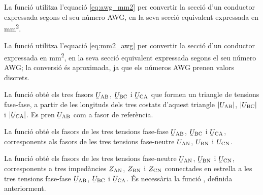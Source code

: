 


La funció  utilitza l'equació \eqref{eq:awg_mm2} per convertir la secció d'un conductor expressada segons el seu número AWG, en la seva secció equivalent expressada en \unit{mm^2}.




La funció  utilitza l'equació \eqref{eq:mm2_awg} per convertir la secció d'un conductor expressada en \unit{mm^2}, en la seva secció equivalent expressada segons el seu número AWG; la conversió és aproximada, ja que els números AWG prenen valors discrets.




La funció  obté els tres fasors $\cmplx{U}\ped{AB}$, $\cmplx{U}\ped{BC}$ i $\cmplx{U}\ped{CA}$ que formen un triangle de tensions fase-fase, a partir de les longituds dels tres costats d'aquest triangle $|\cmplx{U}\ped{AB}|$, $|\cmplx{U}\ped{BC}|$ i $|\cmplx{U}\ped{CA}|$. Es pren $\cmplx{U}\ped{AB}$ com a fasor de referència.




La funció  obté els fasors de les tres tensions fase-fase $\cmplx{U}\ped{AB}$, $\cmplx{U}\ped{BC}$ i $\cmplx{U}\ped{CA}$, corresponents als fasors de les tres tensions fase-neutre
$\cmplx{U}\ped{AN}$, $\cmplx{U}\ped{BN}$ i $\cmplx{U}\ped{CN}$.




La funció  obté els fasors de les tres tensions fase-neutre $\cmplx{U}\ped{AN}$, $\cmplx{U}\ped{BN}$ i $\cmplx{U}\ped{CN}$, corresponents a tres impedàncies $\cmplx{Z}\ped{AN}$, $\cmplx{Z}\ped{BN}$ i $\cmplx{Z}\ped{CN}$ connectades en estrella a  les tres tensions fase-fase
$\cmplx{U}\ped{AB}$, $\cmplx{U}\ped{BC}$ i $\cmplx{U}\ped{CA}$. És necessària la funció , definida anteriorment.

